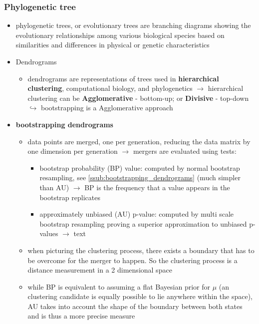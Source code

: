 \documentclass[12pt,a4paper]{article}
\begin{document}
\subsubsection{Phylogenetic tree} %
\label{ssub:phylogenetic_tree}
\begin{itemize}
  \item phylogenetic trees, or evolutionary trees are branching diagrams showing the evolutionary relationships among various biological species based on similarities and differences in physical or genetic characteristics
  \item Dendrograms
  \begin{itemize}
    \item dendrograms are representations of trees used in \textbf{hierarchical clustering}, computational biology, and phylogenetics
    \newline \indent $\longrightarrow$ hierarchical clustering can be \textbf{Agglomerative} - bottom-up; or \textbf{Divisive} - top-down
    \newline \indent $\hookrightarrow$ bootstrapping is a Agglomerative approach 
  \end{itemize}
  \item \textbf{bootstrapping dendrograms}
  \begin{itemize}
    \item data points are merged, one per generation, reducing the data matrix by one dimension per generation
    \newline \indent $\longrightarrow$ mergers are evaluated using tests:
    \begin{itemize}
      \item bootstrap probability (BP) value: computed by normal bootstrap resampling, see \ref{ssub:bootstrapping_dendrograms} (much simpler than AU)
      \newline \indent $\longrightarrow$ BP is the frequency that a value appears in the bootstrap replicates
      \item approximately unbiased (AU) p-value: computed by multi scale bootstrap resampling proving a superior approximation to unbiased p-values
      \newline \indent $\longrightarrow$ text
    \end{itemize}
    \item when picturing the clustering process, there exists a boundary that has to be overcome for the merger to happen. So the clustering process is a distance measurement in a 2 dimensional space
    \item while BP is equivalent to assuming a flat Bayesian prior for $\mu$ (an clustering candidate is equally possible to lie anywhere within the space), AU takes into account the shape of the boundary between both states and is thus a more precise measure

\end{itemize}
\end{itemize}
\end{document}
